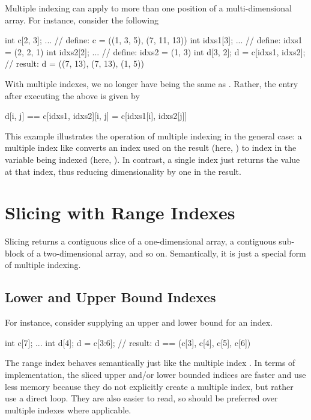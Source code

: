 Multiple indexing can apply to more than one position of a
multi-dimensional array.  For instance, consider the following
%
\begin{stancode}
int c[2, 3];
...                    // define: c = ((1, 3, 5), (7, 11, 13))
int idxs1[3];
...                    // define: idxs1 = (2, 2, 1)
int idxs2[2];
...                    // define: idxs2 = (1, 3)
int d[3, 2];
d = c[idxs1, idxs2];  // result: d = ((7, 13), (7, 13), (1, 5))
\end{stancode}
%
With multiple indexes, we no longer have  being
the same as .  Rather, the entry 
after executing the above is given by
%
\begin{stancode}
d[i, j] == c[idxs1, idxs2][i, j] = c[idxs1[i], idxs2[j]]
\end{stancode}
%
This example illustrates the operation of multiple indexing in the
general case: a multiple index like  converts an index
 used on the result (here, ) to index
 in the variable being indexed (here, ).  In
contrast, a single index just returns the value at that index, thus
reducing dimensionality by one in the result.

\section{Slicing with Range Indexes}

Slicing returns a contiguous slice of a one-dimensional array, a
contiguous sub-block of a two-dimensional array, and so on.
Semantically, it is just a special form of multiple indexing.

\subsection{Lower and Upper Bound Indexes}

For instance, consider supplying an upper and lower bound for an
index.
%
\begin{stancode}
int c[7];
...
int d[4];
d = c[3:6];  // result: d == (c[3], c[4], c[5], c[6])
\end{stancode}
%
The range index  behaves semantically just like the multiple
index .  In terms of implementation, the sliced
upper and/or lower bounded indices are faster and use less memory
because they do not explicitly create a multiple index, but rather use
a direct loop.  They are also easier to read, so should be preferred
over multiple indexes where applicable.


